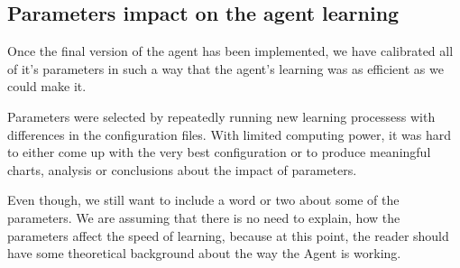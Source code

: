 \documentclass{article}
\begin{document}
\subsection{Parameters impact on the agent learning}
Once the final version of the agent has been implemented, we have calibrated all of it's parameters in such a way that the agent's learning was as efficient as we could make it.

Parameters were selected by repeatedly running new learning processess with differences in the configuration files. With limited computing power, it was hard to either come up with the very best configuration or to produce meaningful charts, analysis or conclusions about the impact of parameters.

Even though, we still want to include a word or two about some of the parameters. We are assuming that there is no need to explain, how the parameters affect the speed of learning, because at this point, the reader should have some theoretical background about the way the Agent is working. 
\end{document}
